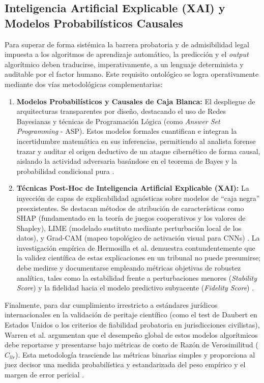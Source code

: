 \documentclass[journal]{IEEEtran}
\begin{document}
\subsection{Inteligencia Artificial Explicable (XAI) y Modelos Probabilísticos Causales}
Para superar de forma sistémica la barrera probatoria y de admisibilidad legal impuesta a los algoritmos de aprendizaje automático, la predicción y el \textit{output} algorítmico deben traducirse, imperativamente, a un lenguaje determinista y auditable por el factor humano. Este requisito ontológico se logra operativamente mediante dos vías metodológicas complementarias:
\begin{enumerate}
    \item \textbf{Modelos Probabilísticos y Causales de Caja Blanca:} El despliegue de arquitecturas transparentes por diseño, destacando el uso de Redes Bayesianas y técnicas de Programación Lógica (como \textit{Answer Set Programming} - ASP). Estos modelos formales cuantifican e integran la incertidumbre matemática en sus inferencias, permitiendo al analista forense trazar y auditar el origen deductivo de un ataque cibernético de forma causal, aislando la actividad adversaria basándose en el teorema de Bayes y la probabilidad condicional pura \cite{MaccaroneLeeT.2025IACi, CostantiniStefania2015DFEA}.
    \item \textbf{Técnicas Post-Hoc de Inteligencia Artificial Explicable (XAI):} La inyección de capas de explicabilidad agnósticas sobre modelos de ``caja negra'' preexistentes. Se destacan métodos de atribución de características como SHAP (fundamentado en la teoría de juegos cooperativos y los valores de Shapley), LIME (modelado sustituto mediante perturbación local de los datos), y Grad-CAM (mapeo topológico de activación visual para CNNs) \cite{HallStuartW.2022APoC, KhalidZainab2024TauX}. La investigación empírica de Hermosilla et al. demuestra contundentemente que la validez científica de estas explicaciones en un tribunal no puede presumirse; debe medirse y documentarse empleando métricas objetivas de robustez analítica, tales como la estabilidad frente a perturbaciones menores (\textit{Stability Score}) y la fidelidad hacia el modelo predictivo subyacente (\textit{Fidelity Score}) \cite{HermosillaPamela2025EAfF}.
\end{enumerate}
Finalmente, para dar cumplimiento irrestricto a estándares jurídicos internacionales en la validación de peritaje científico (como el test de Daubert en Estados Unidos o los criterios de fiabilidad probatoria en jurisdicciones civilistas), Warren et al. argumentan que el desempeño global de estos modelos algorítmicos debe reportarse y presentarse bajo métricas de costo de Razón de Verosimilitud ($C_{llr}$). Esta metodología trasciende las métricas binarias simples y proporciona al juez decisor una medida probabilística y estandarizada del peso empírico y el margen de error pericial \cite{WarrenEricM.2025Ceal}.
\end{document}

